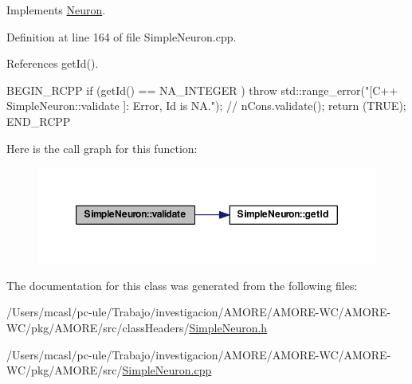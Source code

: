 Implements \hyperlink{class_neuron_a37f57f44fefa328ea0b7ab32b52c853e}{Neuron}.



Definition at line 164 of file SimpleNeuron.cpp.



References getId().


\begin{DoxyCode}
{
  BEGIN_RCPP
  if (getId() == NA_INTEGER ) throw std::range_error("[C++ SimpleNeuron::validate
      ]: Error, Id is NA.");
  // nCons.validate();
  return (TRUE);
END_RCPP}
\end{DoxyCode}


Here is the call graph for this function:\nopagebreak
\begin{figure}[H]
\begin{center}
\leavevmode
\includegraphics[width=354pt]{class_simple_neuron_a9e7173abb892281d0b2ffb0efc82f0e5_cgraph}
\end{center}
\end{figure}




The documentation for this class was generated from the following files:\begin{DoxyCompactItemize}
\item 
/Users/mcasl/pc-\/ule/Trabajo/investigacion/AMORE/AMORE-\/WC/AMORE-\/WC/pkg/AMORE/src/classHeaders/\hyperlink{_simple_neuron_8h}{SimpleNeuron.h}\item 
/Users/mcasl/pc-\/ule/Trabajo/investigacion/AMORE/AMORE-\/WC/AMORE-\/WC/pkg/AMORE/src/\hyperlink{_simple_neuron_8cpp}{SimpleNeuron.cpp}\end{DoxyCompactItemize}
